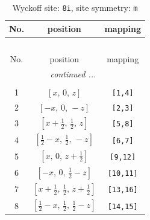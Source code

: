 \documentclass[fleqn,8pt]{jsarticle}
\begin{document}
\begin{longtable}{ccc}
\caption{Wyckoff site: {\tt 8i}, site symmetry: {\tt m}}
 \\
 \hline \hline
No. & position & mapping \\ \hline \endfirsthead

\multicolumn{2}{l}{\tablename\ \thetable{}} \\
 \hline \hline
No. & position & mapping \\ \hline \endhead

 \hline \hline
\multicolumn{2}{r}{\footnotesize\it continued ...} \\ \endfoot

 \hline \hline
\multicolumn{2}{r}{} \\ \endlastfoot

1 & $\left[ x,\, 0,\, z \right]$ & {\tt [1,4]} \\ \hline
2 & $\left[ - x,\, 0,\, - z \right]$ & {\tt [2,3]} \\ \hline
3 & $\left[ x + \frac{1}{2},\, \frac{1}{2},\, z \right]$ & {\tt [5,8]} \\ \hline
4 & $\left[ \frac{1}{2} - x,\, \frac{1}{2},\, - z \right]$ & {\tt [6,7]} \\ \hline
5 & $\left[ x,\, 0,\, z + \frac{1}{2} \right]$ & {\tt [9,12]} \\ \hline
6 & $\left[ - x,\, 0,\, \frac{1}{2} - z \right]$ & {\tt [10,11]} \\ \hline
7 & $\left[ x + \frac{1}{2},\, \frac{1}{2},\, z + \frac{1}{2} \right]$ & {\tt [13,16]} \\ \hline
8 & $\left[ \frac{1}{2} - x,\, \frac{1}{2},\, \frac{1}{2} - z \right]$ & {\tt [14,15]} \\
\end{longtable}
\renewcommand{\arraystretch}{1.2}
\end{document}
